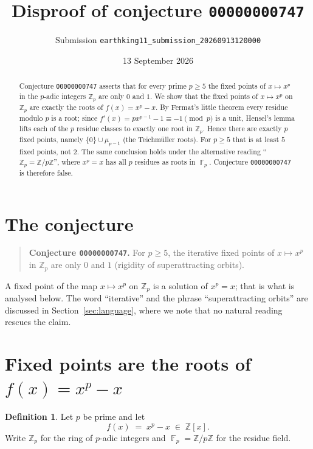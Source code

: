 \documentclass[11pt]{article}
\title{Disproof of conjecture \texttt{00000000747}}
\author{Submission \texttt{earthking11\_submission\_20260913120000}}
\date{13 September 2026}
\theoremstyle{definition}
\newtheorem{definition}[theorem]{Definition}
\DeclareMathOperator{\F}{\mathbb{F}}
\newcommand{\Zp}{\mathbb{Z}_p}
\newcommand{\Z}{\mathbb{Z}}
\begin{document}
\maketitle

\begin{abstract}
Conjecture \texttt{00000000747} asserts that for every prime $p\ge 5$ the fixed
points of $x\mapsto x^{p}$ in the $p$-adic integers $\Zp$ are only $0$ and $1$.
We show that the fixed points of $x\mapsto x^{p}$ on $\Zp$ are exactly the roots
of $f(x)=x^{p}-x$. By Fermat's little theorem every residue modulo $p$ is a root;
since $f'(x)=p x^{p-1}-1\equiv -1 \pmod p$ is a unit, Hensel's lemma lifts each of
the $p$ residue classes to exactly one root in $\Zp$. Hence there are exactly $p$
fixed points, namely $\{0\}\cup\mu_{p-1}$ (the Teichm\"uller roots). For $p\ge 5$
that is at least $5$ fixed points, not $2$. The same conclusion holds under the
alternative reading ``$\Zp=\Z/p\Z$'', where $x^{p}=x$ has all $p$ residues as
roots in $\F_p$. Conjecture \texttt{00000000747} is therefore false.
\end{abstract}

\section{The conjecture}

\begin{quote}
\textbf{Conjecture \texttt{00000000747}.} For $p\ge 5$, the iterative fixed
points of $x\mapsto x^{p}$ in $\Zp$ are only $0$ and $1$ (rigidity of
superattracting orbits).
\end{quote}

A fixed point of the map $x\mapsto x^{p}$ on $\Zp$ is a solution of
$x^{p}=x$; that is what is analysed below. The word ``iterative'' and the phrase
``superattracting orbits'' are discussed in
Section~\ref{sec:language}, where we note that no natural reading rescues the
claim.

\section{Fixed points are the roots of $f(x)=x^{p}-x$}

\begin{definition}\label{def:f}
Let $p$ be prime and let
\[
  f(x) \;=\; x^{p}-x \;\in\; \Z[x].
\]
Write $\Zp$ for the ring of $p$-adic integers and $\F_p=\Z/p\Z$ for the residue
field.
\end{definition}
\end{document}
